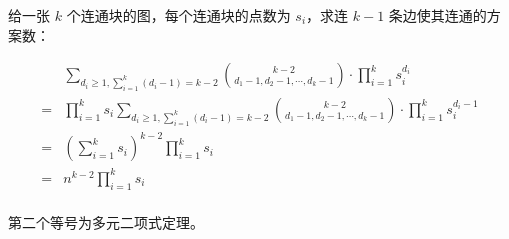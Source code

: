 给一张 $k$ 个连通块的图，每个连通块的点数为 $s_i$，求连 $k - 1$ 条边使其连通的方案数：

$$
\begin{aligned}
& \sum\limits_{d_i \ge 1, \sum_{i = 1}^k (d_i - 1) = k - 2} \binom{k - 2}{d_1 - 1, d_2 - 1, \cdots, d_k - 1} \cdot \prod\limits_{i = 1}^k s_i^{d_i} \\
=& \prod\limits_{i = 1}^k s_i \sum\limits_{d_i \ge 1, \sum_{i = 1}^k (d_i - 1) = k - 2} \binom{k - 2}{d_1 - 1, d_2 - 1, \cdots, d_k - 1} \cdot \prod\limits_{i = 1}^k s_i^{d_i - 1} \\
=& (\sum\limits_{i = 1}^k s_i)^{k - 2} \prod\limits_{i = 1}^k s_i \\
=& n^{k - 2} \prod\limits_{i = 1}^k s_i \\
\end{aligned}
$$

第二个等号为多元二项式定理。